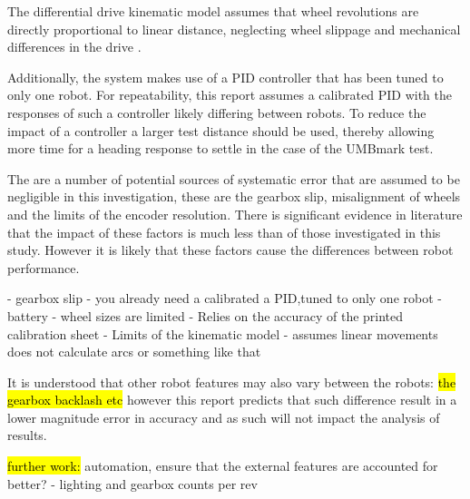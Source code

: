 \documentclass[conference]{IEEEtran}
\begin{document}
The differential drive kinematic model assumes that wheel revolutions are directly proportional to linear distance, neglecting wheel slippage and mechanical differences in the drive \cite{odometry}.

Additionally, the system makes use of a PID controller that has been tuned to only one robot. For repeatability, this report assumes a calibrated PID with the responses of such a controller likely differing between robots. 
To reduce the impact of a controller a larger test distance should be used, thereby allowing more time for a heading response to settle in the case of the UMBmark test.

The are a number of potential sources of systematic error that are assumed to be negligible in this investigation, these are the gearbox slip, misalignment of wheels and the limits of the encoder resolution. There is significant evidence in literature that the impact of these factors is much less than of those investigated in this study. However it is likely that these factors cause the differences between robot performance.



- gearbox slip
- you already need a calibrated a PID,tuned to only one robot
- battery
- wheel sizes are limited
- Relies on the accuracy of the printed calibration sheet
- Limits of the kinematic model - assumes linear movements does not calculate arcs or something like that




It is understood that other robot features may also vary between the robots: \hl{the gearbox backlash etc} however this report predicts that such difference result in a lower magnitude error in accuracy and as such will not impact the analysis of results.


\hl{further work:}
automation, ensure that the external features are accounted for better? - lighting and gearbox
counts per rev





 

\end{document}
